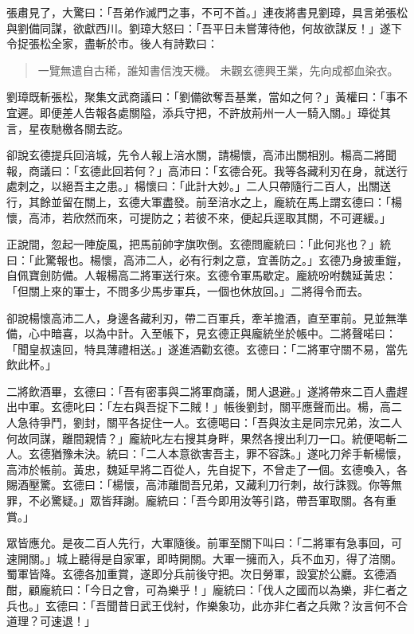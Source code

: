 張肅見了，大驚曰：「吾弟作滅門之事，不可不首。」連夜將書見劉璋，具言弟張松與劉備同謀，欲獻西川。劉璋大怒曰：「吾平日未嘗薄待他，何故欲謀反！」遂下令捉張松全家，盡斬於市。後人有詩歎曰：

\begin{quote}
一覽無遣自古稀，誰知書信洩天機。
未觀玄德興王業，先向成都血染衣。
\end{quote}

劉璋既斬張松，聚集文武商議曰：「劉備欲奪吾基業，當如之何？」黃權曰：「事不宜遲。即便差人告報各處關隘，添兵守把，不許放荊州一人一騎入關。」璋從其言，星夜馳檄各關去訖。

卻說玄德提兵回涪城，先令人報上涪水關，請楊懷，高沛出關相別。楊高二將聞報，商議曰：「玄德此回若何？」高沛曰：「玄德合死。我等各藏利刃在身，就送行處刺之，以絕吾主之患。」楊懷曰：「此計大妙。」二人只帶隨行二百人，出關送行，其餘並留在關上，玄德大軍盡發。前至涪水之上，龐統在馬上謂玄德曰：「楊懷，高沛，若欣然而來，可提防之；若彼不來，便起兵逕取其關，不可遲緩。」

正說間，忽起一陣旋風，把馬前帥字旗吹倒。玄德問龐統曰：「此何兆也？」統曰：「此驚報也。楊懷，高沛二人，必有行刺之意，宜善防之。」玄德乃身披重鎧，自佩寶劍防備。人報楊高二將軍送行來。玄德令軍馬歇定。龐統吩咐魏延黃忠：「但關上來的軍士，不問多少馬步軍兵，一個也休放回。」二將得令而去。

卻說楊懷高沛二人，身邊各藏利刃，帶二百軍兵，牽羊擔酒，直至軍前。見並無準備，心中暗喜，以為中計。入至帳下，見玄德正與龐統坐於帳中。二將聲喏曰：「聞皇叔遠回，特具薄禮相送。」遂進酒勸玄德。玄德曰：「二將軍守關不易，當先飲此杯。」

二將飲酒畢，玄德曰：「吾有密事與二將軍商議，閒人退避。」遂將帶來二百人盡趕出中軍。玄德叱曰：「左右與吾捉下二賊！」帳後劉封，關平應聲而出。楊，高二人急待爭鬥，劉封，關平各捉住一人。玄德喝曰：「吾與汝主是同宗兄弟，汝二人何故同謀，離間親情？」龐統叱左右搜其身畔，果然各搜出利刀一口。統便喝斬二人。玄德猶豫未決。統曰：「二人本意欲害吾主，罪不容誅。」遂叱刀斧手斬楊懷，高沛於帳前。黃忠，魏延早將二百從人，先自捉下，不曾走了一個。玄德喚入，各賜酒壓驚。玄德曰：「楊懷，高沛離間吾兄弟，又藏利刀行刺，故行誅戮。你等無罪，不必驚疑。」眾皆拜謝。龐統曰：「吾今即用汝等引路，帶吾軍取關。各有重賞。」

眾皆應允。是夜二百人先行，大軍隨後。前軍至關下叫曰：「二將軍有急事回，可速開關。」城上聽得是自家軍，即時開關。大軍一擁而入，兵不血刃，得了涪關。蜀軍皆降。玄德各加重賞，遂即分兵前後守把。次日勞軍，設宴於公廳。玄德酒酣，顧龐統曰：「今日之會，可為樂乎！」龐統曰：「伐人之國而以為樂，非仁者之兵也。」玄德曰：「吾聞昔日武王伐紂，作樂象功，此亦非仁者之兵歟？汝言何不合道理？可速退！」

